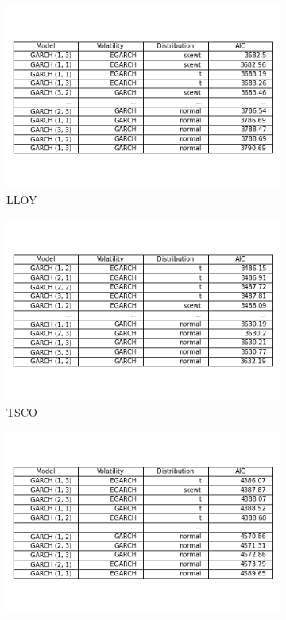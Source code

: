 \begin{figure}[hbt!]
\begin{subfigure}{.49\linewidth}
  \includegraphics[width=\linewidth]{images/modelFit/stockLLOY.L.png}
  \caption{LLOY}
  \label{fig:A}
\end{subfigure} %
\begin{subfigure}{.49\linewidth}
  \includegraphics[width=\linewidth]{images/modelFit/stockTSCO.L.png}
  \caption{TSCO}
  \label{fig:B}
\end{subfigure}
\medskip %
\begin{subfigure}{.49\linewidth}
  \includegraphics[width=\linewidth]{images/modelFit/stockRR.L.png}

\end{subfigure}
\end{figure}
